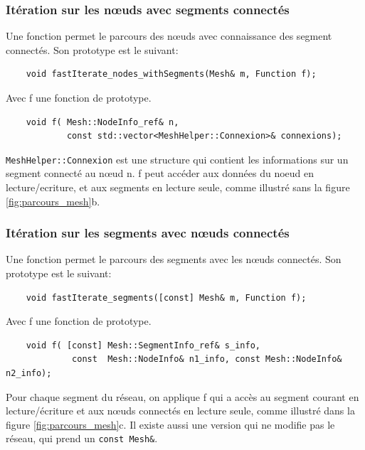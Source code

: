 \subsubsection{Itération sur les nœuds avec segments connectés}

Une fonction permet le parcours des nœuds avec connaissance des segment connectés.  Son prototype est le suivant:

\begin{verbatim}
    void fastIterate_nodes_withSegments(Mesh& m, Function f);
\end{verbatim}
Avec f une fonction de prototype.
\begin{verbatim}
    void f( Mesh::NodeInfo_ref& n, 
            const std::vector<MeshHelper::Connexion>& connexions);
\end{verbatim}


\verb|MeshHelper::Connexion| est une structure qui contient les informations sur un segment connecté au nœud n. f peut accéder aux données du noeud en lecture/ecriture, et aux segments en lecture seule, comme illustré sans la figure \ref{fig:parcours_mesh}b.

\subsubsection{Itération sur les segments avec nœuds connectés}

Une fonction permet le parcours des segments avec les nœuds connectés. Son prototype est le suivant:

\begin{verbatim}
    void fastIterate_segments([const] Mesh& m, Function f);
\end{verbatim}
Avec f une fonction de prototype.
\begin{verbatim}
    void f( [const] Mesh::SegmentInfo_ref& s_info, 
             const  Mesh::NodeInfo& n1_info, const Mesh::NodeInfo& n2_info);
\end{verbatim}

Pour chaque segment du réseau, on applique f qui a accès au segment courant en lecture/écriture et aux nœuds connectés en lecture seule, comme illustré dans la figure \ref{fig:parcours_mesh}c. Il existe aussi une version qui ne modifie pas le réseau, qui prend un \verb|const Mesh&|.

